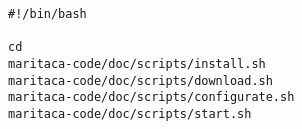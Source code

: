 \begin{lstlisting}[style=Bash]
#!/bin/bash

cd
maritaca-code/doc/scripts/install.sh
maritaca-code/doc/scripts/download.sh
maritaca-code/doc/scripts/configurate.sh
maritaca-code/doc/scripts/start.sh
\end{lstlisting}